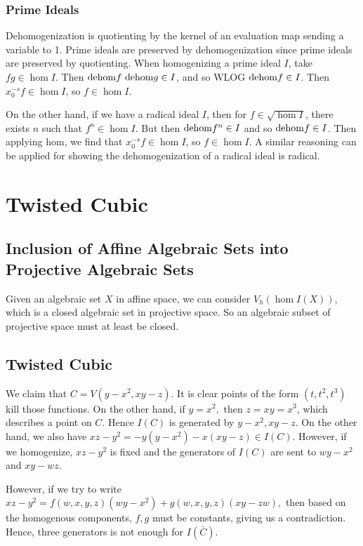 \subsubsection{Prime Ideals} Dehomogenization is quotienting by the kernel of an evaluation map sending a variable to 1. Prime ideals are preserved by dehomogenization since prime ideals are preserved by quotienting. When homogenizing a prime ideal $I$, take $fg \in \hom{I}$. Then $\mathrm{dehom} f \ \mathrm{dehom} g \in I$, and so WLOG $\mathrm{dehom} f \in I$. Then $x_0^{-s} f \in \hom I$, so $f \in \hom I$.

On the other hand, if we have a radical ideal $I$, then for $f \in \sqrt{\hom I}$, there exists $n$ such that $f^n \in \hom I$. But then $\mathrm{dehom}{f}^n \in I$ and so $\mathrm{dehom} f \in I$. Then applying $\mathrm{hom}$, we find that $x_0^{-s} f \in \hom I$, so $f \in \hom I.$ A similar reasoning can be applied for showing the dehomogenization of a radical ideal is radical.

\section{Twisted Cubic}
\subsection{Inclusion of Affine Algebraic Sets into Projective Algebraic Sets} Given an algebraic set $X$ in affine space, we can consider $V_h(\hom {I(X)})$, which is a closed algebraic set in projective space. So an algebraic subset of projective space must at least be closed.

\subsection{Twisted Cubic}
We claim that $C = V(y - x^2, xy - z)$. It is clear points of the form $(t, t^2, t^3)$ kill those functions. On the other hand, if $y = x^2,$ then $z = xy = x^3$, which describes a point on $C$. Hence $I(C)$ is generated by $y - x^2, xy - z$. On the other hand, we also have $xz - y^2 = -y(y - x^2) - x(xy - z) \in I(C)$. However, if we homogenize, $xz - y^2$ is fixed and the generators of $I(C)$ are sent to $wy - x^2$ and $xy - wz$.

However, if we try to write $xz - y^2 = f(w,x,y,z) (wy - x^2) + g(w,x,y,z)(xy - zw),$ then based on the homogenous components, $f, g$ must be constants, giving us a contradiction. Hence, three generators is not enough for $I(\bar{C}).$

